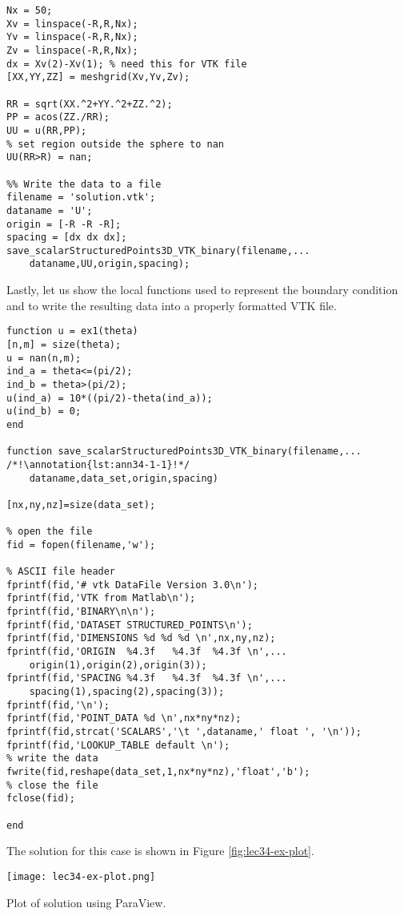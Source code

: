 \begin{lstlisting}[name=lec34-ex, style=myMatlab]
%% Process Result for Plotting 
Nx = 50;
Xv = linspace(-R,R,Nx);
Yv = linspace(-R,R,Nx);
Zv = linspace(-R,R,Nx);
dx = Xv(2)-Xv(1); % need this for VTK file
[XX,YY,ZZ] = meshgrid(Xv,Yv,Zv);

RR = sqrt(XX.^2+YY.^2+ZZ.^2);
PP = acos(ZZ./RR);
UU = u(RR,PP); 
% set region outside the sphere to nan
UU(RR>R) = nan;

%% Write the data to a file
filename = 'solution.vtk';
dataname = 'U';
origin = [-R -R -R]; 
spacing = [dx dx dx];
save_scalarStructuredPoints3D_VTK_binary(filename,...
    dataname,UU,origin,spacing);
\end{lstlisting}
Lastly, let us show the local functions used to represent the boundary condition and to write the resulting data into a properly formatted VTK file.
\begin{lstlisting}[name=lec34-ex, style=myMatlab]
%% Local functions
function u = ex1(theta)
[n,m] = size(theta);
u = nan(n,m);
ind_a = theta<=(pi/2);
ind_b = theta>(pi/2);
u(ind_a) = 10*((pi/2)-theta(ind_a));
u(ind_b) = 0;
end

function save_scalarStructuredPoints3D_VTK_binary(filename,... /*!\annotation{lst:ann34-1-1}!*/
    dataname,data_set,origin,spacing)

[nx,ny,nz]=size(data_set);

% open the file
fid = fopen(filename,'w');

% ASCII file header
fprintf(fid,'# vtk DataFile Version 3.0\n');
fprintf(fid,'VTK from Matlab\n');
fprintf(fid,'BINARY\n\n');
fprintf(fid,'DATASET STRUCTURED_POINTS\n');
fprintf(fid,'DIMENSIONS %d %d %d \n',nx,ny,nz);
fprintf(fid,'ORIGIN  %4.3f   %4.3f  %4.3f \n',...
    origin(1),origin(2),origin(3));
fprintf(fid,'SPACING %4.3f   %4.3f  %4.3f \n',...
    spacing(1),spacing(2),spacing(3));
fprintf(fid,'\n');
fprintf(fid,'POINT_DATA %d \n',nx*ny*nz);
fprintf(fid,strcat('SCALARS','\t ',dataname,' float ', '\n'));
fprintf(fid,'LOOKUP_TABLE default \n');
% write the data
fwrite(fid,reshape(data_set,1,nx*ny*nz),'float','b');
% close the file
fclose(fid);

end

\end{lstlisting}
The solution for this case is shown in Figure \ref{fig:lec34-ex-plot}.
\begin{marginfigure}
\texttt{[image: lec34-ex-plot.png]}
\caption{Plot of solution using ParaView.}
\label{fig:lec34-ex-plot}
\end{marginfigure}

